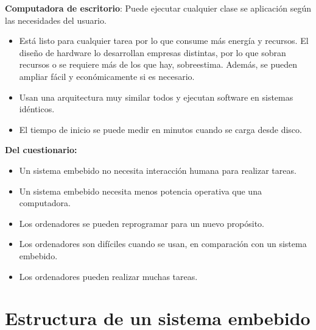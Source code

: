 \documentclass[12pt, twoside, openright]{report} %
\begin{document}
\textbf{Computadora de escritorio}: Puede ejecutar cualquier clase se
aplicación según las necesidades del usuario.

\begin{itemize}
	\item Está listo para cualquier tarea por lo que consume más energía y
	      recursos. El diseño de hardware lo desarrollan empresas distintas, por
	      lo que sobran recursos o se requiere más de los que hay, sobreestima.
	      Además, se pueden ampliar fácil y económicamente si es necesario.
	\item Usan una arquitectura muy similar todos y ejecutan software en
	      sistemas idénticos.
	\item El tiempo de inicio se puede medir en minutos cuando se carga desde
	      disco.
\end{itemize}

\textbf{Del cuestionario:}

\begin{itemize}
	\item Un sistema embebido no necesita interacción humana para realizar
	      tareas.
	\item Un sistema embebido necesita menos potencia operativa que una
	      computadora.
	\item Los ordenadores se pueden reprogramar para un nuevo propósito.
	\item Los ordenadores son difíciles cuando se usan, en comparación con un
	      sistema embebido.
	\item Los ordenadores pueden realizar muchas tareas.
\end{itemize}

\section{Estructura de un sistema embebido}
\end{document}
